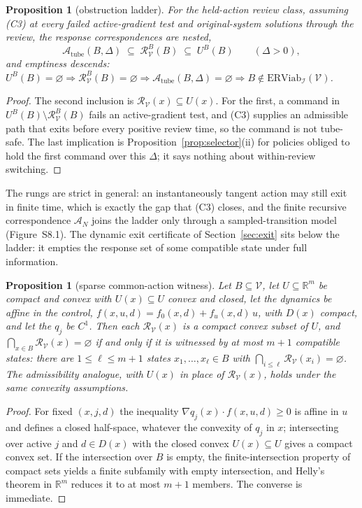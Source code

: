 \documentclass[11pt,a4paper]{article}
\theoremstyle{plain}
\newtheorem{proposition}[theorem]{Proposition}
\theoremstyle{definition}
\theoremstyle{remark}
\newcommand{\R}{\mathbb{R}}
\newcommand{\ERViab}{\mathrm{ERViab}}
\newcommand{\cV}{\mathcal{V}}
\newcommand{\cI}{\mathcal{I}}
\newcommand{\cR}{\mathcal{R}}
\newcommand{\cA}{\mathcal{A}}
\newcommand{\Atube}{\cA_{\mathrm{tube}}}
\newcommand{\hyp}[1]{\textup{(#1)}}
\begin{document}
\begin{proposition}[obstruction ladder]\label{prop:ladder}
For the held-action review class, assuming \hyp{C3} at every failed active-gradient test and original-system solutions through the review, the response correspondences are nested,
\[
\Atube(B,\Delta)\;\subseteq\;\cR^B_\cV(B)\;\subseteq\;U^B(B)\qquad(\Delta>0),
\]
and emptiness descends: $U^B(B)=\varnothing\Rightarrow\cR^B_\cV(B)=\varnothing\Rightarrow\Atube(B,\Delta)=\varnothing\Rightarrow B\notin\ERViab_\cI(\cV)$.
\end{proposition}

\begin{proof}
The second inclusion is $\cR_\cV(x)\subseteq U(x)$. For the first, a command in $U^B(B)\setminus\cR^B_\cV(B)$ fails an active-gradient test, and \hyp{C3} supplies an admissible path that exits before every positive review time, so the command is not tube-safe. The last implication is Proposition~\ref{prop:selector}(ii) for policies obliged to hold the first command over this $\Delta$; it says nothing about within-review switching.
\end{proof}

The rungs are strict in general: an instantaneously tangent action may still exit in finite time, which is exactly the gap that \hyp{C3} closes, and the finite recursive correspondence $\cA_N$ joins the ladder only through a sampled-transition model (Figure~S8.1). The dynamic exit certificate of Section~\ref{sec:exit} sits below the ladder: it empties the response set of some compatible state under full information.

\begin{proposition}[sparse common-action witness]\label{prop:helly}
Let $B\subseteq\cV$, let $U\subseteq\R^m$ be compact and convex with $U(x)\subseteq U$ convex and closed, let the dynamics be affine in the control, $f(x,u,d)=f_0(x,d)+f_u(x,d)\,u$, with $D(x)$ compact, and let the $q_j$ be $C^1$. Then each $\cR_\cV(x)$ is a compact convex subset of $U$, and $\bigcap_{x\in B}\cR_\cV(x)=\varnothing$ if and only if it is witnessed by at most $m+1$ compatible states: there are $1\le\ell\le m+1$ states $x_1,\dots,x_\ell\in B$ with $\bigcap_{i\le\ell}\cR_\cV(x_i)=\varnothing$. The admissibility analogue, with $U(x)$ in place of $\cR_\cV(x)$, holds under the same convexity assumptions.
\end{proposition}

\begin{proof}
For fixed $(x,j,d)$ the inequality $\nabla q_j(x)\cdot f(x,u,d)\ge0$ is affine in $u$ and defines a closed half-space, whatever the convexity of $q_j$ in $x$; intersecting over active $j$ and $d\in D(x)$ with the closed convex $U(x)\subseteq U$ gives a compact convex set. If the intersection over $B$ is empty, the finite-intersection property of compact sets yields a finite subfamily with empty intersection, and Helly's theorem in $\R^m$ \citep{helly1923} reduces it to at most $m+1$ members. The converse is immediate.
\end{proof}
\end{document}
